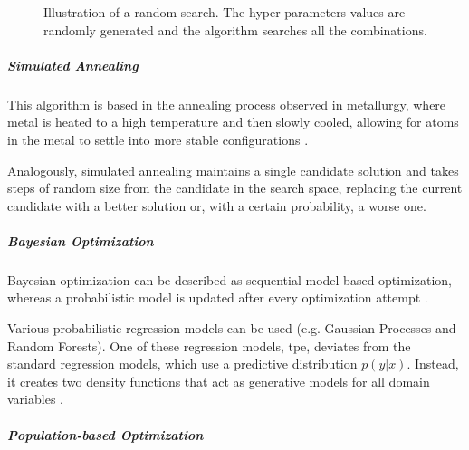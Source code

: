 \begin{figure}[ht]
	\centering
    \caption{Illustration of a random search. The hyper parameters values are randomly generated and the algorithm searches all the combinations.}
    \label{random}
 \end{figure}

\subparagraph{Simulated Annealing}

This algorithm is based in the annealing process observed in metallurgy, where metal is heated to a high temperature and then slowly cooled, allowing for atoms in the metal to settle into more stable configurations \parencite{elshawi2019automated}.

Analogously, simulated annealing maintains a single candidate solution and takes steps of random size from the candidate in the search space, replacing the current candidate with a better solution or, with a certain probability, a worse one.

\subparagraph{Bayesian Optimization}

Bayesian optimization can be described as sequential model-based optimization, whereas a probabilistic model is updated after every optimization attempt \parencite{dewancker}.

Various probabilistic regression models can be used (e.g. Gaussian Processes and Random Forests). One of these regression models, \acrfull{tpe}, deviates from the standard regression models, which use a predictive distribution $p(y|x)$. Instead, it creates two density functions that act as generative models for all domain variables \parencite{NIPS2011_86e8f7ab}\parencite{elshawi2019automated}.

\subparagraph{Population-based Optimization}

